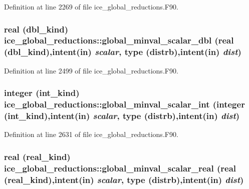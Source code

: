 Definition at line 2269 of file ice\_\-global\_\-reductions.F90.\hypertarget{namespaceice__global__reductions_adf0dafd3b9b49b80c493ccf9f7fd7072}{
\subsubsection[{global\_\-minval\_\-scalar\_\-dbl}]{\setlength{\rightskip}{0pt plus 5cm}real (dbl\_\-kind) ice\_\-global\_\-reductions::global\_\-minval\_\-scalar\_\-dbl (real (dbl\_\-kind),intent(in) {\em scalar}, \/  type (distrb),intent(in) {\em dist})}}
\label{namespaceice__global__reductions_adf0dafd3b9b49b80c493ccf9f7fd7072}


Definition at line 2499 of file ice\_\-global\_\-reductions.F90.\hypertarget{namespaceice__global__reductions_ab4a2ba94077b4e88fd24c9c1950026e3}{
\subsubsection[{global\_\-minval\_\-scalar\_\-int}]{\setlength{\rightskip}{0pt plus 5cm}integer (int\_\-kind) ice\_\-global\_\-reductions::global\_\-minval\_\-scalar\_\-int (integer (int\_\-kind),intent(in) {\em scalar}, \/  type (distrb),intent(in) {\em dist})}}
\label{namespaceice__global__reductions_ab4a2ba94077b4e88fd24c9c1950026e3}


Definition at line 2631 of file ice\_\-global\_\-reductions.F90.\hypertarget{namespaceice__global__reductions_a9bd28e27173eaf4c5a60841318b3d9f1}{
\subsubsection[{global\_\-minval\_\-scalar\_\-real}]{\setlength{\rightskip}{0pt plus 5cm}real (real\_\-kind) ice\_\-global\_\-reductions::global\_\-minval\_\-scalar\_\-real (real (real\_\-kind),intent(in) {\em scalar}, \/  type (distrb),intent(in) {\em dist})}}
\label{namespaceice__global__reductions_a9bd28e27173eaf4c5a60841318b3d9f1}


